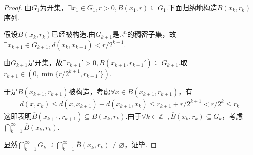 \begin{proof}
    由\(G_1\)为开集，\(\exists x_1 \in G_1, r>0, B(x_1,r) \subseteq G_1\).下面{\kaishu 归纳地构造\(B(x_k,r_k)\)序列}.

    假设\(B(x_k,r_k)\)已经被构造.由\(G_{k+1}\)是\(\mathbb{R}^n\)的稠密子集，故\(\exists x_{k+1} \in G_{k+1}, d(x_k,x_{k+1})<r/2^{k+1}\).

    由\(G_{k+1}\)是开集，故\(\exists r_{k+1}'>0, B(x_{k+1},r_{k+1}') \subseteq G_{k+1}\).取\(r_{k+1} \in (0, \min\{r/2^{k+1}, r_{k+1}'\})\).

    于是\(B(x_{k+1},r_{k+1})\)被构造，考虑\(\forall x \in \overline{B}(x_{k+1},r_{k+1})\)，有
    \begin{align*}
        d(x,x_k) \leq d(x,x_{k+1})+d(x_{k+1},x_k) \leq r_{k+1}+r/2^{k+1}<r/2^k \leq r_k
    \end{align*}
    这即表明\(\overline{B}(x_{k+1},r_{k+1}) \subseteq B(x_k,r_k)\).由于\(\forall k \in \mathbb{Z}^+, \overline{B}(x_k,r_k) \subseteq G_k\)，考虑\(\bigcap_{k=1}^\infty \overline{B}(x_k,r_k)\).

    显然\(\bigcap_{k=1}^\infty G_k \supseteq \bigcap_{k=1}^\infty \overline{B}(x_k,r_k) \ne \varnothing\)，证毕.
\end{proof}

